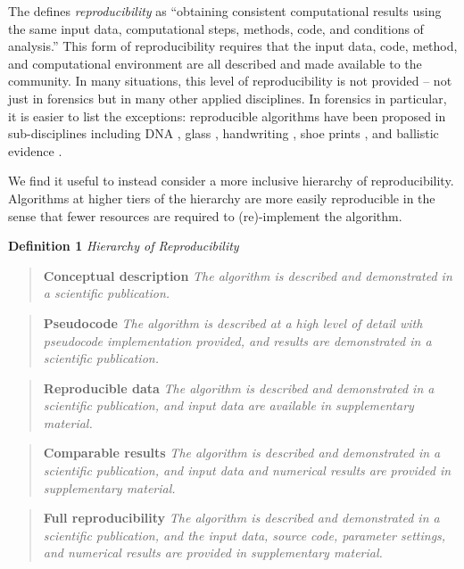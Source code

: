 \documentclass[11pt,]{isuthesis}
\begin{document}
The \citet{nasem_2019} defines \emph{reproducibility} as ``obtaining consistent computational results using the same input data, computational steps, methods, code, and conditions of analysis.'' This form of reproducibility requires that the input data, code, method, and computational environment are all described and made available to the community.
In many situations, this level of reproducibility is not provided -- not just in forensics but in many other applied disciplines.
In forensics in particular, it is easier to list the exceptions: reproducible algorithms have been proposed in sub-disciplines including DNA \citep{Tvedebrink2020, osiris, openForSciR}, glass \citep{Curran2000, Park2019}, handwriting \citep{crawford_handwriting_2020}, shoe prints \citep{park_algorithm_2020}, and ballistic evidence \citep{hare_automatic_2016, tai_fully_2018}.

We find it useful to instead consider a more inclusive hierarchy of reproducibility.
Algorithms at higher tiers of the hierarchy are more easily reproducible in the sense that fewer resources are required to (re)-implement the algorithm.

\textbf{Definition 1} \emph{Hierarchy of Reproducibility}

\begin{quote}
\textbf{Conceptual description} \emph{The algorithm is described and demonstrated in a scientific publication.}
\end{quote}

\begin{quote}
\textbf{Pseudocode} \emph{The algorithm is described at a high level of detail with pseudocode implementation provided, and results are demonstrated in a scientific publication.}
\end{quote}

\begin{quote}
\textbf{Reproducible data} \emph{The algorithm is described and demonstrated in a scientific publication, and input data are available in supplementary material.}
\end{quote}

\begin{quote}
\textbf{Comparable results} \emph{The algorithm is described and demonstrated in a scientific publication, and input data and numerical results are provided in supplementary material.}
\end{quote}

\begin{quote}
\textbf{Full reproducibility} \emph{The algorithm is described and demonstrated in a scientific publication, and the input data, source code, parameter settings, and numerical results are provided in supplementary material.}
\end{quote}
\end{document}
